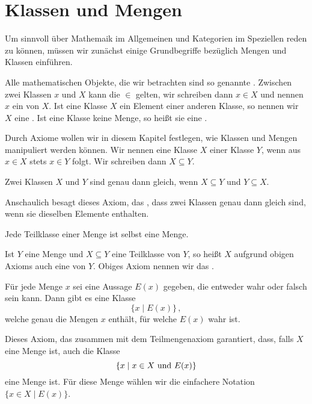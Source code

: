 \section{Klassen und Mengen}
Um sinnvoll über Mathemaik im Allgemeinen und Kategorien im Speziellen reden zu können, müssen wir zunächst einige Grundbegriffe bezüglich Mengen und Klassen einführen.

Alle mathematischen Objekte, die wir betrachten sind so genannte . Zwischen zwei Klassen $x$ und $X$ kann die  $\in$ gelten, wir schreiben dann $x\in X$ und nennen $x$ ein  von $X$. Ist eine Klasse $X$ ein Element einer anderen Klasse, so nennen wir $X$ eine . Ist eine Klasse keine Menge, so heißt sie eine .

Durch Axiome wollen wir in diesem Kapitel festlegen, wie Klassen und Mengen manipuliert werden können. Wir nennen eine Klasse $X$  einer Klasse $Y$, wenn aus $x\in X$ stets $x\in Y$ folgt. Wir schreiben dann $X\subseteq Y$.

\begin{axiom}
Zwei Klassen $X$ und $Y$ sind genau dann gleich, wenn $X\subseteq Y$ und $Y\subseteq X$.
\end{axiom}

Anschaulich besagt dieses Axiom, das , dass zwei Klassen genau dann gleich sind, wenn sie dieselben Elemente enthalten.

\begin{axiom}
Jede Teilklasse einer Menge ist selbst eine Menge.
\end{axiom}

Ist $Y$ eine Menge und $X\subseteq Y$ eine Teilklasse von $Y$, so heißt $X$ aufgrund obigen Axioms auch eine  von $Y$. Obiges Axiom nennen wir das .

\begin{axiom}
Für jede Menge $x$ sei eine Aussage $E(x)$ gegeben, die entweder wahr oder falsch sein kann. Dann gibt es eine Klasse
\[
\{x\mid E(x)\}\,,
\]
welche genau die Mengen $x$ enthält, für welche $E(x)$ wahr ist.
\end{axiom}

Dieses Axiom, das  zusammen mit dem Teilmengenaxiom garantiert, dass, falls $X$ eine Menge ist, auch die Klasse
\[
\{x\mid x\in X\textnormal{ und }E(x)\}
\]
eine Menge ist. Für diese Menge wählen wir die einfachere Notation $\{x\in X\mid E(x)\}$.

